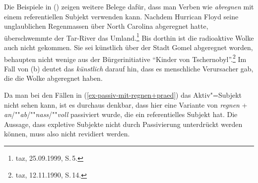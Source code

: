 \noindent
Die Beispiele in () zeigen weitere Belege dafür, dass man Verben wie \emph{abregnen} mit einem referentiellen
Subjekt verwenden kann.
\eal
\ex Nachdem Hurrican Floyd seine unglaublichen Regenmassen über North Carolina abgeregnet hatte, überschwemmte der Tar-River das Umland.\footnote{
 taz, 25.09.1999, S.\,5.
}
\ex Bis dorthin ist die radioaktive Wolke auch nicht gekommen. 
    Sie sei künstlich über der Stadt Gomel abgeregnet worden, behaupten nicht wenige aus der Bürgerinitiative "`Kinder von Tschernobyl"'.\footnote{
taz, 12.11.1990, S.\,14.
}
\zl
Im Fall von (b) deutet das \emph{künstlich} darauf hin, dass es menschliche Verursacher gab, die
die Wolke abgeregnet haben.

Da man bei den Fällen in (\ref{ex-passiv-mit-regnen+praed}) das Aktiv"=Subjekt nicht sehen kann,
ist es durchaus denkbar, dass hier eine Variante von \emph{regnen} + \emph{an}/""\emph{ab}/""\emph{nass}/""\emph{voll}
passiviert wurde, die ein referentielles Subjekt hat.
Die Aussage, dass expletive Subjekte nicht durch Passivierung unterdrückt werden können, muss also
nicht revidiert werden.
\largerpage[2]

